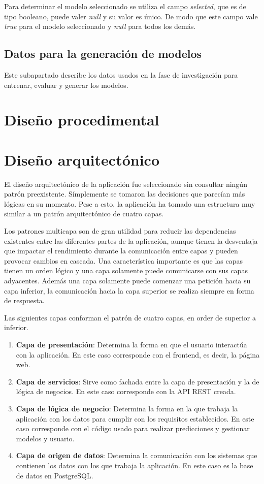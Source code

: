 Para determinar el modelo seleccionado se utiliza el campo \textit{selected},
que es de tipo booleano, puede valer \textit{null} y su valor es único. De modo
que este campo vale \textit{true} para el modelo seleccionado y \textit{null}
para todos los demás.

\subsection{Datos para la generación de modelos}

Este subapartado describe los datos usados en la fase de investigación para
entrenar, evaluar y generar los modelos.

\section{Diseño procedimental}

\section{Diseño arquitectónico}

El diseño arquitectónico de la aplicación fue seleccionado sin consultar ningún
patrón preexistente. Símplemente se tomaron las decisiones que parecían más
lógicas en su momento. Pese a esto, la aplicación ha tomado una estructura muy
similar a un patrón arquitectónico de cuatro capas.

Los patrones multicapa son de gran utilidad para reducir las dependencias
existentes entre las diferentes partes de la aplicación, aunque tienen la
desventaja que impactar el rendimiento durante la comunicación entre capas y
pueden provocar cambios en cascada. Una característica importante es que las
capas tienen un orden lógico y una capa solamente puede comunicarse con sus
capas adyacentes. Además una capa solamente puede comenzar una petición hacia su
capa inferior, la comunicación hacia la capa superior se realiza siempre en
forma de respuesta.

Las siguientes capas conforman el patrón de cuatro capas, en order de superior a
inferior.

\begin{enumerate}
    \item \textbf{Capa de presentación}: Determina la forma en que el usuario
    interactúa con la aplicación. En este caso corresponde con el frontend, es
    decir, la página web.
    \item \textbf{Capa de servicios}: Sirve como fachada entre la capa de
    presentación y la de lógica de negocios. En este caso corresponde con la API
    REST creada.
    \item \textbf{Capa de lógica de negocio}: Determina la forma en la que
    trabaja la aplicación con los datos para cumplir con los requisitos
    establecidos. En este caso corresponde con el código usado para realizar
    predicciones y gestionar modelos y usuario.
    \item \textbf{Capa de origen de datos}: Determina la comunicación con los
    sistemas que contienen los datos con los que trabaja la aplicación. En este
    caso es la base de datos en PostgreSQL.
\end{enumerate}
